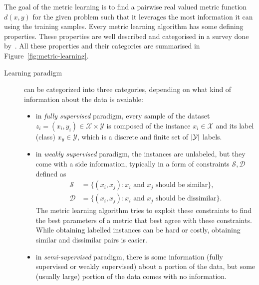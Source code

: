 \documentclass[12pt,a4paper]{report}
\begin{document}
The goal of the metric learning is to find a pairwise real valued metric function $d(x,y)$ for the given problem such that it leverages the most information it can using the training samples. Every metric learning algorithm has some defining properties. These properties are well described and categorised in a survey done by~\citep{bellet2013survey}. All these properties and their categories are summarised in Figure~\ref{fig:metric-learning}.


\newpage

\begin{description}
\item [Learning paradigm] can be categorized into three categories, depending on what kind of information about the data is avaiable:
\begin{itemize}
\item in \textit{fully supervised} paradigm, every sample of the dataset $z_i=(x_i,y_i) \in \mathcal{X} \times \mathcal{Y}$ is composed of the instance $x_i \in \mathcal{X}$ and its label (class) $x_y \in \mathcal{Y}$, which is a discrete and finite set of $\left|{\mathcal{Y}}\right|$ labels.
\item in \textit{weakly supervised} paradigm, the instances are unlabeled, but they come with a side information, typically in a form of constraints $\mathcal{S}, \mathcal{D}$ defined as %
\begin{align}
\mathcal{S} &= \lbrace(x_i,x_j): x_i \text{ and } x_j \text{ should be similar} \rbrace, \label{eq:similar} \\
\mathcal{D} &= \lbrace(x_i,x_j): x_i \text{ and } x_j \text{ should be dissimilar} \rbrace. \label{eq:dissimilar}
\end{align}
The metric learning algorithm tries to exploit these constraints to find the best parameters of a metric that best agree with these constraints. While obtaining labelled instances can be hard or costly, obtaining similar and dissimilar pairs is easier.
\item in \textit{semi-supervised} paradigm, there is some information (fully supervised or weakly supervised) about a portion of the data, but some (usually large) portion of the data comes with no information.
\end{itemize}


\end{description}
\end{document}
